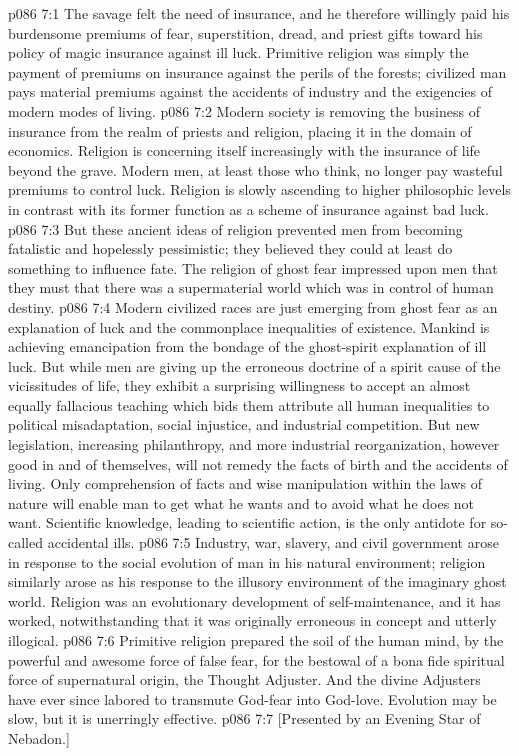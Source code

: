 \vs p086 7:1 The savage felt the need of insurance, and he therefore willingly paid his burdensome premiums of fear, superstition, dread, and priest gifts toward his policy of magic insurance against ill luck. Primitive religion was simply the payment of premiums on insurance against the perils of the forests; civilized man pays material premiums against the accidents of industry and the exigencies of modern modes of living.
\vs p086 7:2 Modern society is removing the business of insurance from the realm of priests and religion, placing it in the domain of economics. Religion is concerning itself increasingly with the insurance of life beyond the grave. Modern men, at least those who think, no longer pay wasteful premiums to control luck. Religion is slowly ascending to higher philosophic levels in contrast with its former function as a scheme of insurance against bad luck.
\vs p086 7:3 But these ancient ideas of religion prevented men from becoming fatalistic and hopelessly pessimistic; they believed they could at least do something to influence fate. The religion of ghost fear impressed upon men that they must  that there was a supermaterial world which was in control of human destiny.
\vs p086 7:4 Modern civilized races are just emerging from ghost fear as an explanation of luck and the commonplace inequalities of existence. Mankind is achieving emancipation from the bondage of the ghost\hyp{}spirit explanation of ill luck. But while men are giving up the erroneous doctrine of a spirit cause of the vicissitudes of life, they exhibit a surprising willingness to accept an almost equally fallacious teaching which bids them attribute all human inequalities to political misadaptation, social injustice, and industrial competition. But new legislation, increasing philanthropy, and more industrial reorganization, however good in and of themselves, will not remedy the facts of birth and the accidents of living. Only comprehension of facts and wise manipulation within the laws of nature will enable man to get what he wants and to avoid what he does not want. Scientific knowledge, leading to scientific action, is the only antidote for so\hyp{}called accidental ills.\plusone
\pc \vs p086 7:5 Industry, war, slavery, and civil government arose in response to the social evolution of man in his natural environment; religion similarly arose as his response to the illusory environment of the imaginary ghost world. Religion was an evolutionary development of self\hyp{}maintenance, and it has worked, notwithstanding that it was originally erroneous in concept and utterly illogical.
\vs p086 7:6 Primitive religion prepared the soil of the human mind, by the powerful and awesome force of false fear, for the bestowal of a bona fide spiritual force of supernatural origin, the Thought Adjuster. And the divine Adjusters have ever since labored to transmute God\hyp{}fear into God\hyp{}love. Evolution may be slow, but it is unerringly effective.
\vsetoff
\vs p086 7:7 [Presented by an Evening Star of Nebadon.]
